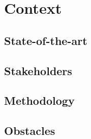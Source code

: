 \section{Context}
\subsection{State-of-the-art}
\subsection{Stakeholders}
\subsection{Methodology}
\subsection{Obstacles}